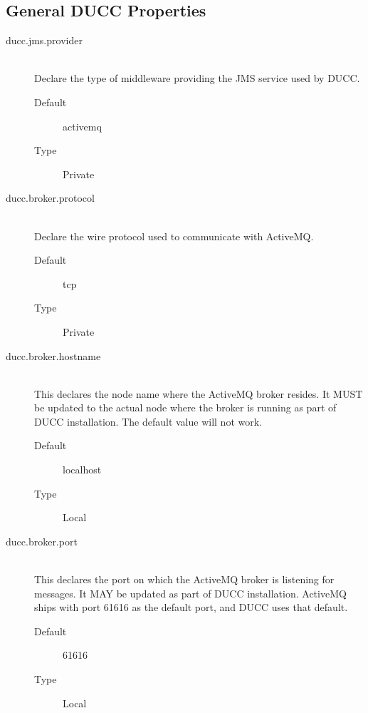 \subsection{General DUCC Properties}
    \begin{description}
       \item[ducc.jms.provider] \hfill \\
         Declare the type of middleware providing the JMS service used by DUCC.
         \begin{description}
           \item[Default] activemq 
           \item[Type]Private 
         \end{description}
           
       \item[ducc.broker.protocol] \hfill \\
         Declare the wire protocol used to communicate with ActiveMQ. 
         \begin{description}
           \item[Default] tcp 
           \item[Type] Private 
         \end{description}

       \item[ducc.broker.hostname] \hfill \\
         This declares the node name where the ActiveMQ broker resides. It MUST be updated to 
         the actual node where the broker is running as part of DUCC installation. The default value 
         will not work.          
         \begin{description}               
           \item[Default]localhost 
           \item[Type] Local 
         \end{description}

       \item[ducc.broker.port] \hfill \\
         This declares the port on which the ActiveMQ broker is listening for
         messages. It MAY be updated as part of DUCC installation. ActiveMQ ships with port
         61616 as the default port, and DUCC uses that default.         
         \begin{description}
           \item[Default] 61616              
           \item[Type] Local 
         \end{description}
           

\end{description}
